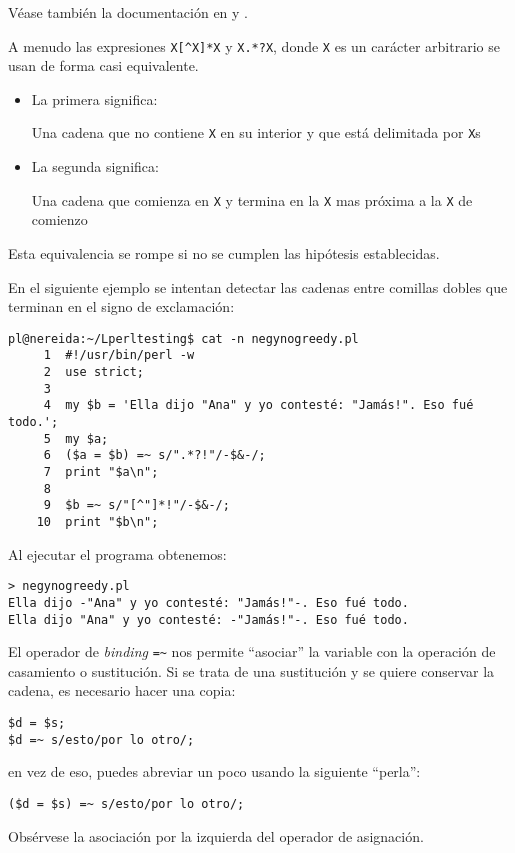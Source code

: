 Véase también la documentación en  y .

A menudo las expresiones
\verb|X[^X]*X|
y \verb|X.*?X|, donde \verb|X| es un carácter arbitrario se usan de forma casi equivalente.

\begin{itemize}
\item
La primera significa:

\begin{it}
Una cadena que no contiene \verb|X| en su interior y que está delimitada por \verb|X|s
\end{it}
\item
La segunda significa:

\begin{it}
Una cadena que comienza en \verb|X| y termina en la \verb|X| mas próxima a la \verb|X| de comienzo
\end{it}
\end{itemize}

Esta equivalencia se rompe si no se cumplen las hipótesis establecidas.

En el siguiente ejemplo se intentan detectar 
las cadenas entre comillas dobles que terminan en el signo de exclamación:
\begin{verbatim}
pl@nereida:~/Lperltesting$ cat -n negynogreedy.pl
     1  #!/usr/bin/perl -w
     2  use strict;
     3
     4  my $b = 'Ella dijo "Ana" y yo contesté: "Jamás!". Eso fué todo.';
     5  my $a;
     6  ($a = $b) =~ s/".*?!"/-$&-/;
     7  print "$a\n";
     8
     9  $b =~ s/"[^"]*!"/-$&-/;
    10  print "$b\n";
\end{verbatim}

Al ejecutar el programa obtenemos:
\begin{verbatim}
> negynogreedy.pl
Ella dijo -"Ana" y yo contesté: "Jamás!"-. Eso fué todo.
Ella dijo "Ana" y yo contesté: -"Jamás!"-. Eso fué todo.
\end{verbatim}

\label{section:copia}
El operador de \emph{binding} \verb|=~| nos permite ``asociar'' la variable 
con la operación de casamiento o sustitución. Si se trata de una sustitución
y se quiere conservar la cadena, es necesario hacer una copia:
\begin{verbatim}
$d = $s;
$d =~ s/esto/por lo otro/;
\end{verbatim}
en vez de eso, puedes abreviar un poco usando la siguiente ``perla'':
\begin{verbatim}
($d = $s) =~ s/esto/por lo otro/;
\end{verbatim}
Obsérvese la asociación por la izquierda del operador de asignación.

